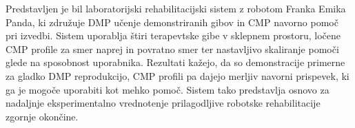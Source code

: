 \documentclass[a4paper]{article}
\begin{document}
Predstavljen je bil laboratorijski rehabilitacijski sistem z robotom Franka
Emika Panda, ki združuje DMP učenje demonstriranih gibov in CMP navorno pomoč
pri izvedbi. Sistem uporablja štiri terapevtske gibe v sklepnem prostoru,
ločene CMP profile za smer naprej in povratno smer ter nastavljivo skaliranje
pomoči glede na sposobnost uporabnika. Rezultati kažejo, da so demonstracije
primerne za gladko DMP reprodukcijo, CMP profili pa dajejo merljiv navorni
prispevek, ki ga je mogoče uporabiti kot mehko pomoč. Sistem tako predstavlja
osnovo za nadaljnje eksperimentalno vrednotenje prilagodljive robotske
rehabilitacije zgornje okončine.

\small


\end{document}

